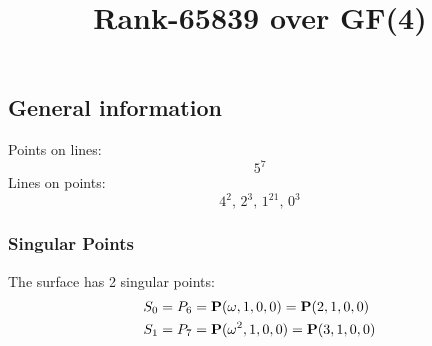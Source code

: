 \documentclass{article}
\newcommand\setTBstruts{\def\T{\rule{0pt}{2.6ex}}%
\def\B{\rule[-1.2ex]{0pt}{0pt}}}
\newcommand{\bP}{{\bf P}}
\begin{document}
 
\setTBstruts



{\allowdisplaybreaks%






\title{Rank-65839 over GF(4)}
\author{}%
\maketitle%
%
{}



\subsection*{General information}
Points on lines:
$$
5^7$$
Lines on points:
$$
4^2,\,2^3,\,1^{21},\,0^3$$
\subsubsection*{Singular Points}
The surface has 2 singular points:\\
\begin{align*}
S_{0} &= P_{6}=\bP(\omega , 1, 0, 0) = \bP(2, 1, 0, 0)\\
S_{1} &= P_{7}=\bP(\omega^{2}, 1, 0, 0) = \bP(3, 1, 0, 0)\\
\end{align*}
}
\end{document}
